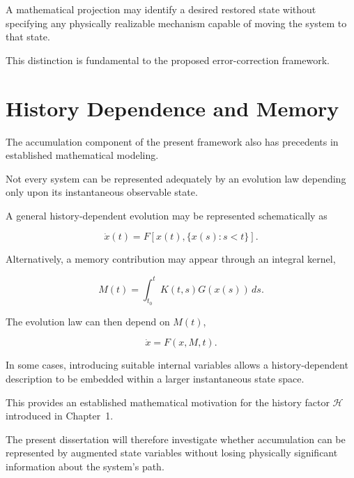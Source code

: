 \documentclass[12pt,oneside]{book}
\begin{document}
A mathematical projection may identify a desired restored state
without specifying any physically realizable mechanism capable
of moving the system to that state.

This distinction is fundamental to the proposed error-correction
framework.


\section{History Dependence and Memory}
\label{sec:history-dependent-systems}

The accumulation component of the present framework also has
precedents in established mathematical modeling.

Not every system can be represented adequately by an evolution
law depending only upon its instantaneous observable state.

A general history-dependent evolution may be represented
schematically as

\begin{equation}
    \dot{x}(t)
    =
    F
    \left[
        x(t),
        \{x(s):s<t\}
    \right].
    \label{eq:history-functional}
\end{equation}

Alternatively, a memory contribution may appear through an
integral kernel,

\begin{equation}
    M(t)
    =
    \int_{t_0}^{t}
        K(t,s)
        G(x(s))
    \,ds.
    \label{eq:memory-kernel}
\end{equation}

The evolution law can then depend on \(M(t)\),

\begin{equation}
    \dot{x}
    =
    F(x,M,t).
    \label{eq:memory-augmented-system}
\end{equation}

In some cases, introducing suitable internal variables allows a
history-dependent description to be embedded within a larger
instantaneous state space.

This provides an established mathematical motivation for the
history factor \(\mathcal{H}\) introduced in Chapter~1.

The present dissertation will therefore investigate whether
accumulation can be represented by augmented state variables
without losing physically significant information about the
system's path.
\end{document}
